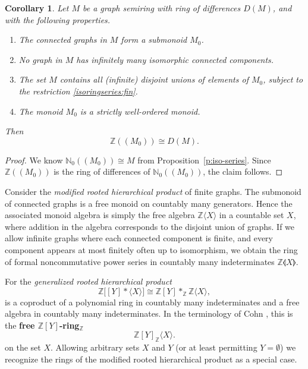 \documentclass{amsart}
\theoremstyle{plain}
\newtheorem{corollary}[thm]{Corollary}
\theoremstyle{definition}
\newcommand{\defit}[1]{\textbf{#1}}
\newcommand{\bN}{\mathbb N}
\newcommand{\bZ}{\mathbb Z}
\newcommand{\diff}{D}
\newcommand{\hmnser}[2]{{#1}(\!({#2})\!)}
\begin{document}
\begin{corollary} \label{c:iso-ringseries}
  Let $M$ be a graph semiring with ring of differences $\diff(M)$, and with the following properties.
  \begin{enumerate}
  \item \label{isoringseries:submonoid} The connected graphs in $M$ form a submonoid $M_0$.
  \item \label{isoringseries:fin} No graph in $M$ has infinitely many isomorphic connected components.
  \item \label{isoringseries:all} The set $M$ contains all \textup(infinite\textup) disjoint unions of elements of $M_0$, subject to the restriction \textup{\ref{isoringseries:fin}}.
  \item \label{isoringseries:order} The monoid $M_0$ is a strictly well-ordered monoid.
  \end{enumerate}
  Then
  \[
    \hmnser{\bZ}{M_0} \cong D(M).
  \]
\end{corollary}

\begin{proof}
  We know $\hmnser{\bN_0}{M_0} \cong M$ from Proposition~\ref{p:iso-series}.
  Since $\hmnser{\bZ}{M_0}$ is the ring of differences of $\hmnser{\bN_0}{M_0}$, the claim follows.
\end{proof}

Consider the \emph{modified rooted hierarchical product} of finite graphs.
The submonoid of connected graphs is a free monoid on countably many generators.
Hence the associated monoid algebra is simply the free algebra $\bZ\langle X \rangle$ in a countable set $X$, where addition in the algebra corresponds to the disjoint union of graphs.
If we allow infinite graphs where each connected component is finite, and every component appears at most finitely often up to isomorphism, we obtain the ring of formal noncommutative power series in countably many indeterminates $\bZ\llangle X \rrangle$.

For the \emph{generalized rooted hierarchical product}
\[
  \bZ\big[ [Y] * \langle X\rangle \big] \cong \bZ[Y] *_\bZ \bZ\langle X\rangle,
\]
is a coproduct of a polynomial ring in countably many indeterminates and a free algebra in countably many indeterminates.
In the terminology of Cohn \cite{cohn06}, this is the \defit{free $\bZ[Y]$-ring$_{\bZ}$}
\[
  \bZ[Y]_\bZ \langle X \rangle.
\]
on the set $X$.
Allowing arbitrary sets $X$ and $Y$ (or at least permitting $Y=\emptyset$) we recognize the rings of the modified rooted hierarchical product as a special case.
\end{document}

